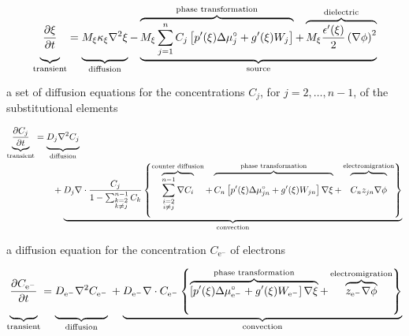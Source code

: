 \documentclass[tocAsPDFpart]{fipy}
\begin{document}
\[
    \underbrace{
	\frac{\partial \xi}{\partial t}
	\vphantom{M_{\xi}\sum_{j=1}^{n} C_j}
    }_{\text{transient}}
    = 
    \underbrace{
	M_{\xi}\kappa_{\xi}\nabla^2 \xi
	\vphantom{M_{\xi}\sum_{j=1}^{n} C_j}
    }_{\text{diffusion}}
    - 
    \underbrace{
	\overbrace{
	    M_{\xi}\sum_{j=1}^{n} C_j \left[
		p'(\xi) \Delta\mu_j^\circ
		+ g'(\xi) W_j
	    \right]
	}^{\text{phase transformation}}
	+
	\overbrace{
	    M_{\xi}\frac{\epsilon'(\xi)}{2}\left(\nabla\phi\right)^2
	}^{\text{dielectric}}
    }_{\text{source}}
\]

a set of diffusion equations for the concentrations \( C_j \), for \(
j = 2,\ldots, n-1 \), of the substitutional elements

\begin{align*}
    \underbrace{
	\frac{\partial C_j}{\partial t}
    }_{\text{transient}}
    &= \underbrace{
	D_{j}\nabla^2 C_j
	\vphantom{\frac{\partial C_j}{\partial t}}
    }_{\text{diffusion}} \\
    & \qquad + \underbrace{
	D_{j}\nabla\cdot 
	\frac{C_j}{1 - \sum_{\substack{k=2\\ k \neq j}}^{n-1} C_k}
	\left\{
	    \overbrace{
		\sum_{\substack{i=2\\ i \neq j}}^{n-1} \nabla C_i
	    }^{\text{counter diffusion}}
	    + 
	    \overbrace{
		C_n \left[
		    p'(\xi) \Delta\mu_{jn}^{\circ}
		    + g'(\xi) W_{jn}
		\right] \nabla\xi
		\vphantom{\sum_{\substack{i=2\\ i \neq j}}^{n-1} \nabla C_i}
	    }^{\text{phase transformation}}
	    +
	    \overbrace{
		C_n z_{jn} \nabla \phi
		\vphantom{\sum_{\substack{i=2\\ i \neq j}}^{n-1} \nabla C_i}
	    }^{\text{electromigration}}
	\right\}
    }_{\text{convection}}
\end{align*}

a diffusion equation for the concentration \( C_{\text{e}^{-}} \) of
electrons

\[
    \underbrace{
	\frac{\partial C_{\text{e}^{-}}}{\partial t}
	\vphantom{\left\{
	    \overbrace{
		\left[p'(\xi)\right]
	    }^{\text{phase transformation}}
	\right\}}
    }_{\text{transient}}
    = \underbrace{
	D_{\text{e}^{-}}\nabla^2 C_{\text{e}^{-}}
	\vphantom{\left\{
	    \overbrace{
		\left[p'(\xi)\right]
	    }^{\text{phase transformation}}
	\right\}}
    }_{\text{diffusion}} \\
    + \underbrace{
	D_{\text{e}^{-}}\nabla\cdot 
	C_{\text{e}^{-}}
	\left\{
	    \overbrace{
		\left[
		    p'(\xi) \Delta\mu_{\text{e}^{-}}^{\circ}
		    + g'(\xi) W_{\text{e}^{-}}
		\right] \nabla\xi
	    }^{\text{phase transformation}}
	    +
	    \overbrace{
		z_{\text{e}^{-}} \nabla \phi
	    }^{\text{electromigration}}
	\right\}
    }_{\text{convection}}
\]
\end{document}
